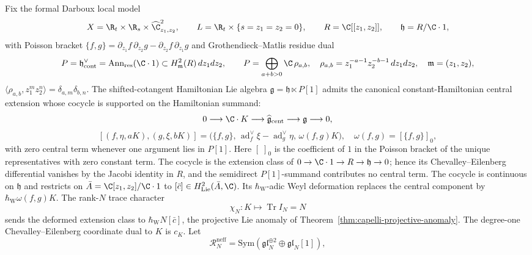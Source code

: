 \documentclass[11pt]{memoir}
\begin{document}
\begin{thm}\label{thm:main-local}
  Fix the formal Darboux local model
  \[
    X=\R_t\times\R_s\times\widehat\C^2_{z_1,z_2},\qquad
    L=\R_t\times\{s=z_1=z_2=0\},\qquad
    R=\C[[z_1,z_2]],\qquad
    \mathfrak h=R/\C\cdot 1,
  \]
  with Poisson bracket $\{f,g\}=\partial_{z_1}f\,\partial_{z_2}g
  -\partial_{z_2}f\,\partial_{z_1}g$ and Grothendieck--Matlis residue
  dual
  \[
    P=\mathfrak h^\vee_{\mathrm{cont}}=
      \operatorname{Ann}_{\mathrm{res}}(\C\cdot1)\subset H^2_{\mathfrak m}(R)\,dz_1dz_2,
    \qquad
    P=\bigoplus_{a+b>0}\C\,\rho_{a,b},
    \quad
    \rho_{a,b}=z_1^{-a-1}z_2^{-b-1}\,dz_1dz_2,
    \quad\mathfrak m=(z_1,z_2),
  \]
  $\langle\rho_{a,b},z_1^mz_2^n\rangle=\delta_{a,m}\delta_{b,n}$.
  The shifted-cotangent Hamiltonian Lie algebra
  $\mathfrak g=\mathfrak h\ltimes P[1]$ admits the canonical
  constant-Hamiltonian central extension whose cocycle is supported on the Hamiltonian
  summand:
  \begin{equation}\label{eq:cent-extension}
    0\longrightarrow\C\cdot K\longrightarrow
    \widehat{\mathfrak g}_{\mathrm{cent}}\longrightarrow
    \mathfrak g\longrightarrow 0,
  \end{equation}
  \[
    [(f,\eta,aK),(g,\xi,bK)]
    =\bigl(\{f,g\},\,\operatorname{ad}^{\vee}_f\xi
      -\operatorname{ad}^{\vee}_g\eta,\,
      \omega(f,g)K\bigr),
    \quad
    \omega(f,g)=[\{f,g\}]_0,
  \]
  with zero central term whenever one argument lies in \(P[1]\).  Here
  \([\;]_0\) is the coefficient of \(1\) in the Poisson bracket of the
  unique representatives with zero constant term.  The cocycle is the
  extension class of \(0\to\C\cdot1\to R\to\mathfrak h\to0\); hence its
  Chevalley--Eilenberg differential vanishes by the Jacobi identity in
  \(R\), and the semidirect \(P[1]\)-summand contributes no central
  term.  The cocycle is continuous on \(\mathfrak h\) and restricts on
  \(\bar A=\C[z_1,z_2]/\C\cdot 1\) to
  $[\bar c]\in H^2_{\mathrm{Lie}}(\bar A,\C)$.  Its
  \(\hbar_{\mathrm W}\)-adic Weyl deformation replaces the central
  component by \(\hbar_{\mathrm W}\omega(f,g)K\).  The rank-\(N\)
  trace character
  \[
    \chi_N\colon K\longmapsto \operatorname{Tr}I_N=N
  \]
  sends the deformed extension class to
  \(\hbar_{\mathrm W}N[\bar c]\), the projective Lie anomaly of
  Theorem~\ref{thm:capelli-projective-anomaly}.  The degree-one
  Chevalley--Eilenberg coordinate dual to \(K\) is \(c_K\).  Let
  \[
    \mathcal R_N^{\mathrm{neff}}
    =
    \mathrm{Sym}(\mathfrak{gl}_N^{\oplus2}\oplus\mathfrak{gl}_N[1]),
\]
\end{thm}
\end{document}

